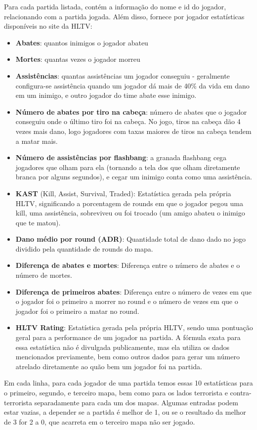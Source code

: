 \documentclass[12pt]{article}
\begin{document}
Para cada partida listada, contém a informação do nome e id do jogador, relacionando com a partida jogada. Além disso, fornece por jogador estatísticas disponíveis no site da HLTV:
\begin{itemize}
\item \textbf{Abates}: quantos inimigos o jogador abateu
\item \textbf{Mortes}: quantas vezes o jogador morreu
\item \textbf{Assistências}: quantas assistências um jogador conseguiu - geralmente configura-se assistência quando um jogador dá mais de 40\% da vida em dano em um inimigo, e outro jogador do time abate esse inimigo.
\item \textbf{Número de abates por tiro na cabeça}: número de abates que o jogador conseguiu onde o último tiro foi na cabeça. No jogo, tiros na cabeça dão 4 vezes mais dano, logo jogadores com taxas maiores de tiros na cabeça tendem a matar mais.
\item \textbf{Número de assistências por flashbang}: a granada flashbang cega jogadores que olham para ela (tornando a tela dos que olham diretamente branca por alguns segundos), e cegar um inimigo conta como uma assistência.
\item \textbf{KAST} (Kill, Assist, Survival, Traded): Estatística gerada pela própria HLTV, significando a porcentagem de rounds em que o jogador pegou uma kill, uma assistência, sobreviveu ou foi trocado (um amigo abateu o inimigo que te matou).
\item \textbf{Dano médio por round (ADR)}: Quantidade total de dano dado no jogo dividido pela quantidade de rounds do mapa.
\item \textbf{Diferença de abates e mortes}: Diferença entre o número de abates e o número de mortes.
\item \textbf{Diferença de primeiros abates}: Diferença entre o número de vezes em que o jogador foi o primeiro a morrer no round e o número de vezes em que o jogador foi o primeiro a matar no round.
\item \textbf{HLTV Rating}: Estatística gerada pela própria HLTV, sendo uma pontuação geral para a performance de um jogador na partida. A fórmula exata para essa estatística não é divulgada publicamente, mas ela utiliza os dados mencionados previamente, bem como outros dados para gerar um número atrelado diretamente ao quão bem um jogador foi na partida.
\end{itemize}

Em cada linha, para cada jogador de uma partida temos essas 10 estatísticas para o primeiro, segundo, e terceiro mapa, bem como para os lados terrorista e contra-terrorista separadamente para cada um dos mapas. Algumas entradas podem estar vazias, a depender se a partida é melhor de 1, ou se o resultado da melhor de 3 for 2 a 0, que acarreta em o terceiro mapa não ser jogado.
\end{document}
